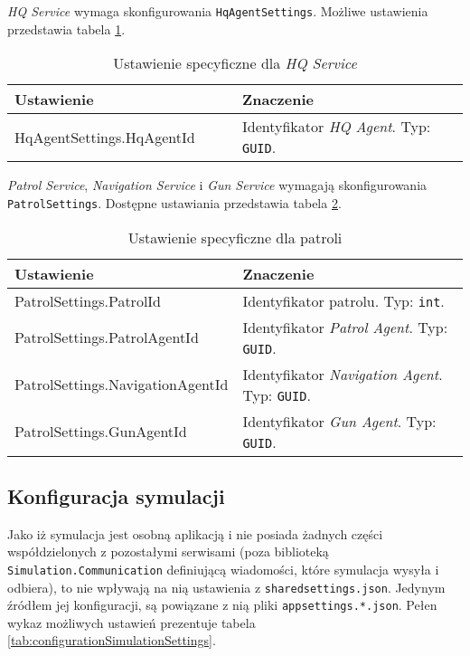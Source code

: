 \par \emph{HQ Service} wymaga skonfigurowania \texttt{HqAgentSettings}. Możliwe ustawienia przedstawia tabela \ref{tab:configurationHqServiceSettings}.

\begin{table}[H]
    \centering
    \begin{tabular}{|p{0.5\linewidth} | p{0.5\linewidth}|} 
     \hline
     Ustawienie & Znaczenie \\
     \hline
     \hline
     HqAgentSettings.HqAgentId & Identyfikator \emph{HQ Agent}. Typ: \texttt{GUID}. \\ 
     \hline
    \end{tabular}
    \caption{Ustawienie specyficzne dla \emph{HQ Service}}
    \label{tab:configurationHqServiceSettings}
\end{table}

\par \emph{Patrol Service}, \emph{Navigation Service} i \emph{Gun Service} wymagają skonfigurowania \texttt{PatrolSettings}. Dostępne ustawiania przedstawia tabela \ref{tab:configurationPatrolServiceSettings}.

\begin{table}[H]
    \centering
    \begin{tabular}{|p{0.5\linewidth} | p{0.5\linewidth}|} 
     \hline
     Ustawienie & Znaczenie \\
     \hline
     \hline
     PatrolSettings.PatrolId & Identyfikator patrolu. Typ: \texttt{int}. \\ 
     \hline
     PatrolSettings.PatrolAgentId & Identyfikator \emph{Patrol Agent}. Typ: \texttt{GUID}. \\ 
     \hline
     PatrolSettings.NavigationAgentId & Identyfikator \emph{Navigation Agent}. Typ: \texttt{GUID}. \\ 
     \hline
     PatrolSettings.GunAgentId & Identyfikator \emph{Gun Agent}. Typ: \texttt{GUID}. \\ 
     \hline
    \end{tabular}
    \caption{Ustawienie specyficzne dla patroli}
    \label{tab:configurationPatrolServiceSettings}
\end{table}


\subsection{Konfiguracja symulacji}

\par Jako iż symulacja jest osobną aplikacją i nie posiada żadnych części współdzielonych z pozostałymi serwisami (poza biblioteką \texttt{Simulation.Communication} definiującą wiadomości, które symulacja wysyła i odbiera), to nie wpływają na nią ustawienia z \texttt{sharedsettings.json}. Jedynym źródłem jej konfiguracji, są powiązane z nią pliki \texttt{appsettings.*.json}. Pełen wykaz możliwych ustawień prezentuje tabela \ref{tab:configurationSimulationSettings}.


